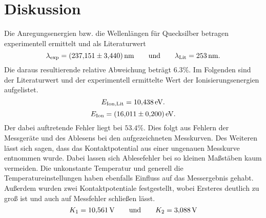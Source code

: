 \section{Diskussion}
Die Anregungsenergien bzw. die Wellenlängen für Quecksilber betragen experimentell ermittelt und als Literaturwert
\begin{equation}
    \lambda_\text{exp} = \SI{237.151 \pm 3.440}{nm} \qquad \text{und} \qquad \lambda_\text{Lit} = \SI{253}{nm}. \notag
\end{equation}
Die daraus resultierende relative Abweichung beträgt $6.3 \%$. 
Im Folgenden sind der Literaturwert und der experimentell ermittelte Wert der Ionisierungsenergien aufgelistet.
\begin{equation}
    E_\text{Ion,Lit} = \SI{10.438}{eV}. \notag
\end{equation}
\begin{equation}
    E_\text{Ion} = \SI{16.011 \pm 0.2}{eV}. \notag
\end{equation}
Der dabei auftretende Fehler liegt bei $ 53.4\%$.
Dies folgt aus Fehlern der Messgeräte und des Ablesens bei den aufgezeichneten Messkurven.
Des Weiteren lässt sich sagen, dass das Kontaktpotential aus einer ungenauen Messkurve entnommen wurde.
Dabei lassen sich Ablesefehler bei so kleinen Maßstäben kaum vermeiden.
Die unkonstante Temperatur und generell die Temperatureinstellungen haben ebenfalls Einfluss auf das Messergebnis gehabt.
Außerdem wurden zwei Kontaktpotentiale festgestellt, wobei Ersteres deutlich zu gro\ss{} ist und auch auf Messfehler schlie\ss{}en lässt.
\begin{equation}
  K_1 = \SI{10.561}{V} \qquad \text{und} \qquad K_2 = \SI{3.088}{V} \notag
\end{equation}
